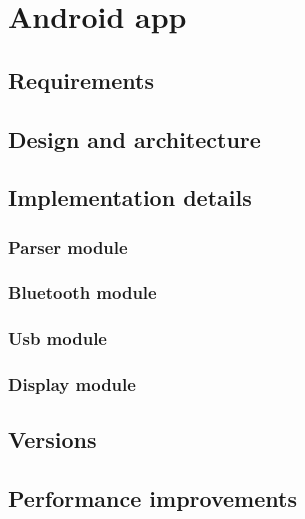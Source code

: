 \chapter{Android app} %


	\section{Requirements} %
	
	\section{Design and architecture}
	
	\section{Implementation details}
	
		\subsection{Parser module}
		
		\subsection{Bluetooth module}
		
		\subsection{Usb module}
		
		\subsection{Display module}
		
		
	\section{Versions}
	
		
	\section{Performance improvements}